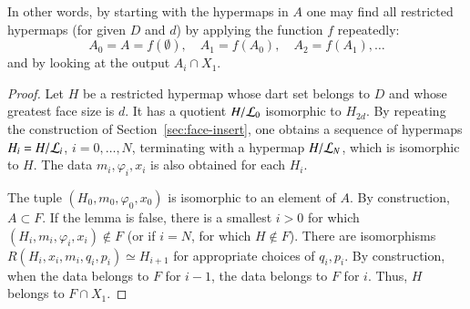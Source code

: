 In other words, by starting with the  hypermaps in $A$
one may find all restricted hypermaps (for given $D$ and $d$) by
applying the function $f$ repeatedly:
\begin{displaymath}
A_0 = A = f(\emptyset),\quad A_1 = f(A_0),\quad A_2 = f(A_1),\ldots
\end{displaymath}
and by looking at the output $A_i \cap X_1$.
%

\begin{proof} Let $H$ be a restricted hypermap whose dart set belongs
to $D$ and whose greatest face size is $d$.  It has a quotient
$H/{\cal L}_0$ isomorphic to $H_{2d}$.  By repeating the
construction of Section~\ref{sec:face-insert}, one obtains a
sequence of hypermaps $H_i = H/{\cal L}_i$, $i=0,\ldots,N$,
terminating with a hypermap $H/{\cal L}_N$, which is isomorphic to
$H$.  The data $m_i,\varphi_i,x_i$ is also obtained for each $H_i$.

The tuple $(H_0,m_0,\varphi_0,x_0)$ is isomorphic to an element of
$A$.  By construction, $A\subset F$.  If the lemma is false, there
is a smallest $i>0$ for which $(H_i,m_i,\varphi_i,x_i)\not\in F$ (or
if $i=N$, for which $H\not\in F$).  There are isomorphisms
$R(H_i,x_i,m_i,q_i,p_i) \simeq H_{i+1}$ for appropriate choices of
$q_i,p_i$.  By construction, when the data belongs to $F$ for $i-1$,
the data belongs to $F$ for $i$.  Thus, $H$ belongs to $F\cap X_1$.
\end{proof}

